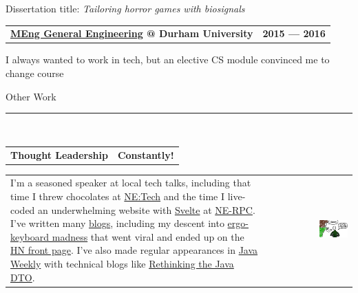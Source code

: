 \documentclass[hidelinks, 12pt, a4paper]{article}
\begin{document}
	\hspace{0.05\linewidth}\begin{minipage}{0.95\linewidth}
		Dissertation title: \emph{Tailoring horror games with biosignals}\\
	\end{minipage}

	
	\begin{tabularx}{\linewidth}{X r}
		\textbf{\href{https://www.dur.ac.uk/courses/info/?id=11558\&title=General+Engineering\&code=H100\&type=MENG\&year=2015}{MEng General Engineering} @ Durham University} & \textbf{2015 --- 2016}
	\end{tabularx}\vspace{2pt}

	\hspace{0.05\linewidth}\begin{minipage}{0.95\linewidth}
		I always wanted to work in tech, but an elective CS module convinced me to change course\\
	\end{minipage}

	
	\vspace{8pt}
	\begin{Large}Other Work\end{Large}
	\rule{200pt}{1pt}\\
	
	
	\begin{tabularx}{\linewidth}{X r}
		\textbf{Thought Leadership} & \textbf{Constantly!}
	\end{tabularx}\vspace{2pt}
	
	\hspace{0.05\linewidth}\begin{tabularx}{0.95\linewidth}{Xr}
		\begin{minipage}{\linewidth}
			I'm a seasoned speaker at local tech talks, including that time I threw chocolates at \href{https://www.youtube.com/watch?v=2ibiA5TEsxw}{NE:Tech} and the time I live-coded an underwhelming website with \href{https://svelte.dev}{Svelte} at \href{https://www.youtube.com/watch?v=P6u0Uv_VxCU}{NE-RPC}.
			I've written many \href{https://stevenwaterman.uk/}{blogs}, including my descent into \href{https://blog.scottlogic.com/2020/10/09/ergo-rabbit-hole.html}{ergo-keyboard madness} that went viral and ended up on the \href{https://news.ycombinator.com/item?id=24728224}{HN front page}.
			I've also made regular appearances in \href{https://www.baeldung.com/java-weekly-315}{Java Weekly} with technical blogs like \href{https://blog.scottlogic.com/2020/01/03/rethinking-the-java-dto.html}{Rethinking the Java DTO}.
		\end{minipage} & \href{https://blog.scottlogic.com/2020/10/09/ergo-rabbit-hole.html}{\includegraphics[align=c, width=0.36\textwidth]{keyboard}}
	\end{tabularx}
\end{document}
